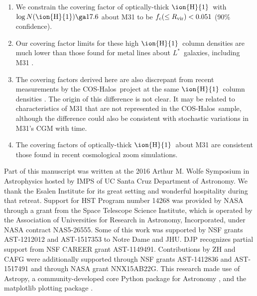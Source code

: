 \documentclass[12pt,preprint]{aastex6}
\newcommand{\virialCovering}{0.051}
\newcommand{\HI}{\ensuremath{\mbox{\ion{H}{1}}}}
\newcommand{\logNHI}{\ensuremath{\log N(\mbox{\ion{H}{1}})}\relax}
\newcommand{\Rvir}{\ensuremath{R_{\rm vir}}\relax}
\newcommand{\lstar}{\ensuremath{L^*}}
\newcommand{\coshalos}{COS-Halos}
\begin{document}
\begin{enumerate}

\item We constrain the covering factor of optically-thick \HI\ with
  $\logNHI \ga 17.6$ about M31 to be
  $f_c (\le \Rvir) < \virialCovering$ (90\% confidence).

\item Our covering factor limits for these high \HI\ column densities
  are much lower than those found for metal lines about \lstar\
  galaxies, including M31 .

\item The covering factors derived here are also discrepant from
  recent measurements by the \coshalos\ project at the same \HI\
  column densities \citep{prochaska2017}. The origin of this
  difference is not clear. It may be related to characteristics of M31
  that are not represented in the \coshalos\ sample, although the
  difference could also be consistent with stochastic variations in
  M31's CGM with time.

\item The covering factors of optically-thick \HI\ about M31 are
  consistent those found in recent cosmological zoom simulations.

\end{enumerate}


\acknowledgements

Part of this manuscript was written at the 2016 Arthur M. Wolfe
Symposium in Astrophysics hosted by IMPS of UC Santa Cruz Department
of Astronomy. We thank the Esalen Institute for its great setting and
wonderful hospitality during that retreat. Support for HST Program
number 14268 was provided by NASA through a grant from the Space
Telescope Science Institute, which is operated by the Association of
Universities for Research in Astronomy, Incorporated, under NASA
contract NAS5-26555.  Some of this work was supported by NSF grants
AST-1212012 and AST-1517353 to Notre Dame and JHU. DJP recognizes
partial support from NSF CAREER grant AST-1149491.  Contributions by
ZH and CAFG were additionally supported through NSF grants AST-1412836
and AST-1517491 and through NASA grant NNX15AB22G.  This research made
use of Astropy, a community-developed core Python package for
Astronomy \citep[][]{robitaille2013}, and the matplotlib plotting
package \citep{hunter2007}.


\end{document}
